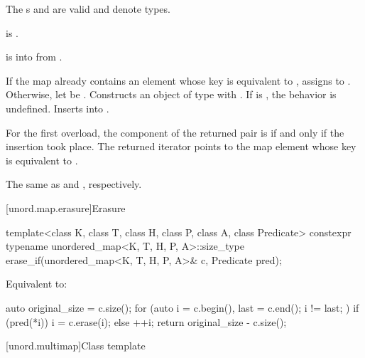 \begin{itemdescr}
\pnum
\constraints
The s  and
 are valid and denote types.

\pnum
\mandates
{} is .

\pnum
\expects
{} is 
into 
from .

\pnum
\effects
If the map already contains an element 
whose key is equivalent to ,
assigns  to .
Otherwise, let  be .
Constructs an object  of type 
with .
If  is ,
the behavior is undefined.
Inserts  into .

\pnum
\returns
For the first overload,
the  component of the returned pair is 
if and only if the insertion took place.
The returned iterator points to the map element
whose key is equivalent to .

\pnum
\complexity
The same as  and , respectively.
\end{itemdescr}

[unord.map.erasure]{Erasure}

%
\begin{itemdecl}
template<class K, class T, class H, class P, class A, class Predicate>
  constexpr typename unordered_map<K, T, H, P, A>::size_type
    erase_if(unordered_map<K, T, H, P, A>& c, Predicate pred);
\end{itemdecl}

\begin{itemdescr}
\pnum
\effects
Equivalent to:
\begin{codeblock}
auto original_size = c.size();
for (auto i = c.begin(), last = c.end(); i != last; ) {
  if (pred(*i)) {
    i = c.erase(i);
  } else {
    ++i;
  }
}
return original_size - c.size();
\end{codeblock}
\end{itemdescr}

[unord.multimap]{Class template }%

